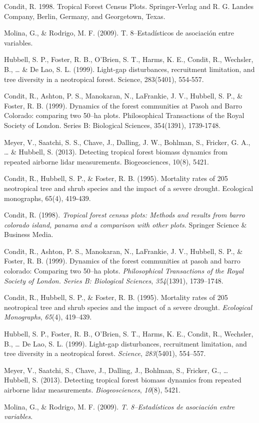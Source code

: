 \documentclass[11pt,]{article}
\begin{document}
Condit, R. 1998. Tropical Forest Census Plots. Springer-Verlag and R. G.
Landes Company, Berlin, Germany, and Georgetown, Texas.

Molina, G., \& Rodrigo, M. F. (2009). T. 8--Estadísticos de asociación
entre variables.

Hubbell, S. P., Foster, R. B., O'Brien, S. T., Harms, K. E., Condit, R.,
Wechsler, B., \ldots{} \& De Lao, S. L. (1999). Light-gap disturbances,
recruitment limitation, and tree diversity in a neotropical forest.
Science, 283(5401), 554-557.

Condit, R., Ashton, P. S., Manokaran, N., LaFrankie, J. V., Hubbell, S.
P., \& Foster, R. B. (1999). Dynamics of the forest communities at Pasoh
and Barro Colorado: comparing two 50--ha plots. Philosophical
Transactions of the Royal Society of London. Series B: Biological
Sciences, 354(1391), 1739-1748.

Meyer, V., Saatchi, S. S., Chave, J., Dalling, J. W., Bohlman, S.,
Fricker, G. A., \ldots{} \& Hubbell, S. (2013). Detecting tropical
forest biomass dynamics from repeated airborne lidar measurements.
Biogeosciences, 10(8), 5421.

Condit, R., Hubbell, S. P., \& Foster, R. B. (1995). Mortality rates of
205 neotropical tree and shrub species and the impact of a severe
drought. Ecological monographs, 65(4), 419-439.

\hypertarget{refs}{}
\hypertarget{ref-condit1998tropical}{}
Condit, R. (1998). \emph{Tropical forest census plots: Methods and
results from barro colorado island, panama and a comparison with other
plots}. Springer Science \& Business Media.

\hypertarget{ref-condit1999dynamics}{}
Condit, R., Ashton, P. S., Manokaran, N., LaFrankie, J. V., Hubbell, S.
P., \& Foster, R. B. (1999). Dynamics of the forest communities at pasoh
and barro colorado: Comparing two 50--ha plots. \emph{Philosophical
Transactions of the Royal Society of London. Series B: Biological
Sciences}, \emph{354}(1391), 1739--1748.

\hypertarget{ref-condit1995mortality}{}
Condit, R., Hubbell, S. P., \& Foster, R. B. (1995). Mortality rates of
205 neotropical tree and shrub species and the impact of a severe
drought. \emph{Ecological Monographs}, \emph{65}(4), 419--439.

\hypertarget{ref-hubbell1999light}{}
Hubbell, S. P., Foster, R. B., O'Brien, S. T., Harms, K. E., Condit, R.,
Wechsler, B., \ldots{} De Lao, S. L. (1999). Light-gap disturbances,
recruitment limitation, and tree diversity in a neotropical forest.
\emph{Science}, \emph{283}(5401), 554--557.

\hypertarget{ref-meyer2013detecting}{}
Meyer, V., Saatchi, S., Chave, J., Dalling, J., Bohlman, S., Fricker,
G., \ldots{} Hubbell, S. (2013). Detecting tropical forest biomass
dynamics from repeated airborne lidar measurements.
\emph{Biogeosciences}, \emph{10}(8), 5421.

\hypertarget{ref-molina2009t}{}
Molina, G., \& Rodrigo, M. F. (2009). \emph{T. 8--Estadísticos de
asociación entre variables}.




\newpage
\singlespacing 
\end{document}
